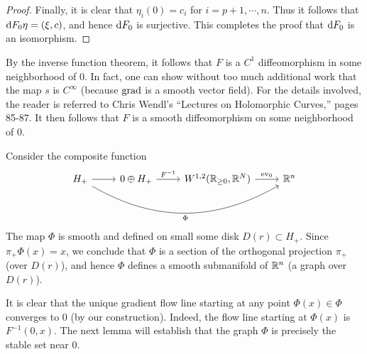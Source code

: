 \documentclass{amsart}
\begin{document}
\begin{proof}
  Finally, it is clear that $\eta_{i}(0)=c_{i}$ for $i=p+1,\cdots,n$. Thus it follows that $\mathrm{d} F_{0}\eta=(\xi,c)$, and hence $\mathrm{d} F_{0}$ is surjective. This completes the proof that $\mathrm{d} F_{0}$ is an isomorphism.  
\end{proof}

By the inverse function theorem, it follows that $F$ is a $C^{1}$ diffeomorphism in some neighborhood of $0$. In fact, one can show without too much additional work that the map $s$ is $C^{\infty}$ (because $\mathrm{grad}$ is a smooth vector field). For the details involved, the reader is referred to Chris Wendl's ``Lectures on Holomorphic Curves,'' pages 85-87. It then follows that $F$ is a smooth diffeomorphism on some neighborhood of $0$.

Consider the composite function
\begin{equation*}
  \begin{tikzcd}
    H_{+}\arrow[r]\arrow[rrr,out=-30,in=210,"\Phi",swap]&0\oplus H_{+}\arrow[r,"F^{-1}"]&W^{1,2}(\R_{\ge 0},\R^{N})\arrow[r,"\text{ev}_{0}"]&\R^{n}
  \end{tikzcd}
\end{equation*}
The map $\Phi$ is smooth and defined on small some disk $D(r)\subset H_{+}$. Since $\pi_{+}\Phi(x)=x$, we conclude that $\Phi$ is a section of the orthogonal projection $\pi_{+}$ (over $D(r)$), and hence $\Phi$ defines a smooth submanifold of $\mathbb{R}^{n}$ (a graph over $D(r)$).

It is clear that the unique gradient flow line starting at any point $\Phi(x)\in \Phi$ converges to $0$ (by our construction). Indeed, the flow line starting at $\Phi(x)$ is $F^{-1}(0,x)$. The next lemma will establish that the graph $\Phi$ is precisely the stable set near $0$.
\end{document}

